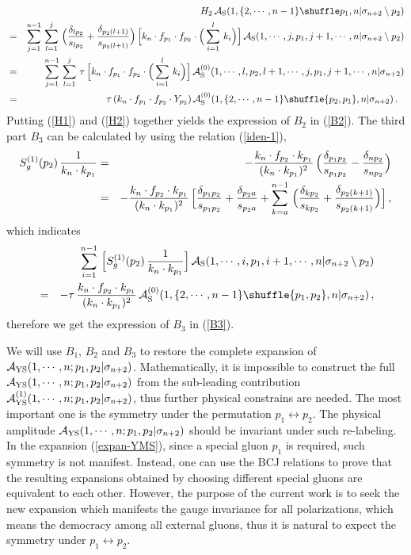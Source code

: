 \documentclass[11pt,a4paper]{article}
\newcommand{\bea}{\begin{eqnarray}}
\newcommand{\eea}{\end{eqnarray}}
\newcommand{\nn}{\nonumber \\}
\def\eref#1{(\ref{#1})}
\begin{document}
%
\bea
& &H_2\,{\cal A}_{\rm S}(1,\{2,\cdots,n-1\}\shuffle p_1,n|\sigma_{n+2}\setminus p_2)\nn
&=&\sum_{j=1}^{n-1}\,\sum_{l=1}^{j}\,\Big({\delta_{lp_2}\over s_{lp_2}}+{\delta_{p_2(l+1)}\over s_{p_2(l+1)}}\Big)\,\Big[k_n\cdot f_{p_1}\cdot f_{p_2}\cdot\Big(\sum_{i=1}^l\,k_i\Big)\Big]\,{\cal A}_{\rm S}(1,\cdots,j,p_1,j+1,\cdots,n|\sigma_{n+2}\setminus p_2)\nn
&=&\sum_{j=1}^{n-1}\,\sum_{l=1}^{j}\,\tau\,\Big[k_n\cdot f_{p_1}\cdot f_{p_2}\cdot\Big(\sum_{i=1}^l\,k_i\Big)\Big]\,{\cal A}^{(0)}_{\rm S}(1,\cdots,l,p_2,l+1,\cdots,j,p_1,j+1,\cdots,n|\sigma_{n+2})\nn
&=&\tau\,(k_n\cdot f_{p_1}\cdot f_{p_2}\cdot Y_{p_2})\,{\cal A}^{(0)}_{\rm S}(1,\{2,\cdots,n-1\}\shuffle\{p_2,p_1\},n|\sigma_{n+2})\,.~~\label{H2}
\eea
%
Putting \eref{H1} and \eref{H2} together yields the expression of $B_2$ in \eref{B2}. The third part $B_3$ can be calculated by using the relation \eref{iden-1},
%
\bea
S^{(1)}_g(p_2)\,{1\over k_n\cdot k_{p_1}}&=&-{k_n\cdot f_{p_2}\cdot k_{p_1}\over(k_n\cdot k_{p_1})^2}\,\Big({\delta_{p_1p_2}\over s_{p_1p_2}}-{\delta_{np_2}\over s_{np_2}}\Big)\nn
&=&-{k_n\cdot f_{p_2}\cdot k_{p_1}\over(k_n\cdot k_{p_1})^2}\,\Big[{\delta_{p_1p_2}\over s_{p_1p_2}}+{\delta_{p_2a}\over s_{p_2a}}+\sum_{k=a}^{n-1}\,\Big({\delta_{kp_2}\over s_{kp_2}}+{\delta_{p_2(k+1)}\over s_{p_2(k+1)}}\Big)\Big]\,,
\eea
%
which indicates
%
\bea
& &\sum_{i=1}^{n-1}\,\Big[S^{(1)}_g(p_2)\,{1\over k_n\cdot k_{p_1}}\Big]\,{\cal A}_{\rm S}(1,\cdots,i,p_1,i+1,\cdots,n|\sigma_{n+2}\setminus p_2)\nn
&=&-\tau\,{k_n\cdot f_{p_2}\cdot k_{p_1}\over(k_n\cdot k_{p_1})^2}\,{\cal A}^{(0)}_{\rm S}(1,\{2,\cdots,n-1\}\shuffle\{p_1,p_2\},n|\sigma_{n+2})\,,
\eea
%
therefore we get the expression of $B_3$ in \eref{B3}.

We will use $B_1$, $B_2$ and $B_3$ to restore the complete expansion of ${\cal A}_{\rm YS}(1,\cdots,n;p_1,p_2|\sigma_{n+2})$. Mathematically, it is impossible to construct the full ${\cal A}_{\rm YS}(1,\cdots,n;p_1,p_2|\sigma_{n+2})$ from the sub-leading contribution ${\cal A}^{(1)}_{\rm YS}(1,\cdots,n;p_1,p_2|\sigma_{n+2})$, thus further physical constrains are needed. The most important one is the symmetry under the permutation $p_1\leftrightarrow p_2$. The physical amplitude ${\cal A}_{\rm YS}(1,\cdots,n;p_1,p_2|\sigma_{n+2})$ should be invariant under such re-labeling. In the expansion \eref{expan-YMS}, since a special gluon $p_1$ is required, such symmetry is not manifest. Instead, one can use the BCJ relations to prove that the resulting expansions obtained by choosing different special gluons  are equivalent to each other. However, the purpose of the current work is to seek the new expansion which manifests the gauge invariance for all polarizations, which means the democracy among all external gluons, thus it is natural to expect the symmetry under $p_1\leftrightarrow p_2$.
\end{document}
